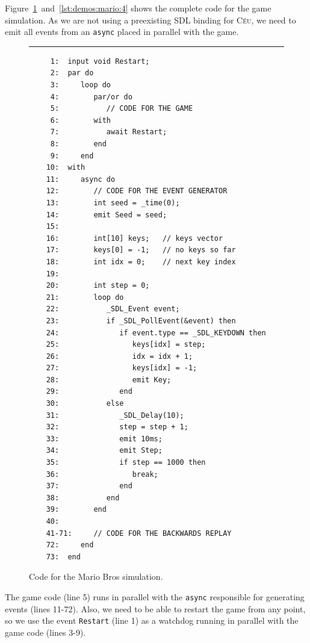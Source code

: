 \documentclass[11pt,a4paper]{article}
\newcommand{\2}{\;\;}
\newcommand{\5}{\;\;\;\;\;}
\newcommand{\CEU}{\textsc{C\'{e}u}}
\newcommand{\code}[1] {{\small{\texttt{#1}}}}
\begin{document}
Figure~\ref{lst:demos:mario:3}~and~\ref{lst:demos:mario:4} shows the complete 
code for the game simulation.
As we are not using a preexisting SDL binding for \CEU{}, we need to emit all 
events from an \code{async} placed in parallel with the game.

\begin{figure}[h!]
\rule{15cm}{0.37pt}
{\small
\begin{verbatim}
     1:  input void Restart;
     2:  par do
     3:     loop do
     4:        par/or do
     5:           // CODE FOR THE GAME
     6:        with
     7:           await Restart;
     8:        end
     9:     end
    10:  with
    11:     async do
    12:        // CODE FOR THE EVENT GENERATOR
    13:        int seed = _time(0);
    14:        emit Seed = seed;
    15:
    16:        int[10] keys;   // keys vector
    17:        keys[0] = -1;   // no keys so far
    18:        int idx = 0;    // next key index
    19:
    20:        int step = 0;
    21:        loop do
    22:           _SDL_Event event;
    23:           if _SDL_PollEvent(&event) then
    24:              if event.type == _SDL_KEYDOWN then
    25:                 keys[idx] = step;
    26:                 idx = idx + 1;
    27:                 keys[idx] = -1;
    28:                 emit Key;
    29:              end
    30:           else
    31:              _SDL_Delay(10);
    32:              step = step + 1;
    33:              emit 10ms;
    34:              emit Step;
    35:              if step == 1000 then
    36:                 break;
    37:              end
    38:           end
    39:        end
    40:
    41-71:     // CODE FOR THE BACKWARDS REPLAY
    72:     end
    73:  end
\end{verbatim}
}
\caption{ Code for the Mario Bros simulation.
\label{lst:demos:mario:3}
}
\end{figure}

The game code (line 5) runs in parallel with the \code{async} responsible for 
generating events (lines 11-72).
Also, we need to be able to restart the game from any point, so we use the 
event \code{Restart} (line 1) as a watchdog running in parallel with the game 
code (lines 3-9).
\end{document}
